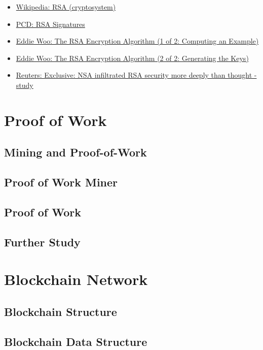\documentclass[a4paper, oneside]{book}
\begin{document}
\begin{itemize}
\begin{itemize}
		\item \href{https://en.wikipedia.org/wiki/RSA_(cryptosystem)}{Wikipedia: RSA (cryptosystem)}
		\item \href{https://cryptobook.nakov.com/digital-signatures/rsa-signatures}{PCD: RSA Signatures}
		\item \href{https://www.youtube.com/watch?v=4zahvcJ9glg}{Eddie Woo: The RSA Encryption Algorithm (1 of 2: Computing an Example)}
		\item \href{https://www.youtube.com/watch?v=oOcTVTpUsPQ}{Eddie Woo: The RSA Encryption Algorithm (2 of 2: Generating the Keys)}
		\item \href{https://www.reuters.com/article/us-usa-security-nsa-rsa/exclusive-nsa-infiltrated-rsa-security-more-deeply-than-thought-study-idUSBREA2U0TY20140331}{Reuters: Exclusive: NSA infiltrated RSA security more deeply than thought - study}
	\end{itemize}
\end{itemize}

\section{Proof of Work}
\subsection{Mining and Proof-of-Work}

\subsection{Proof of Work Miner}

\subsection{Proof of Work}

\subsection{Further Study}

\section{Blockchain Network}
\subsection{Blockchain Structure}
\subsection{Blockchain Data Structure}
\end{document}
